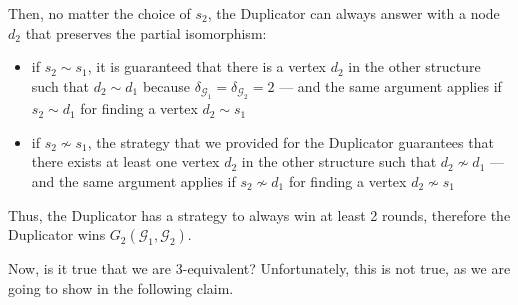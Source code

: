 \documentclass[a4paper, 12pt]{report}
\begin{document}
{{            Then, no matter the choice of $s_2$, the Duplicator can always answer with a node $d_2$ that preserves the partial isomorphism:

            \begin{itemize}
                \item if $s_2 \sim s_1$, it is guaranteed that there is a vertex $d_2$ in the other structure such that $d_2 \sim d_1$ because $\delta_{\mathcal G_1} = \delta_{\mathcal G_2} = 2$ --- and the same argument applies if $s_2 \sim d_1$ for finding a vertex $d_2 \sim s_1$
                \item if $s_2 \nsim s_1$, the strategy that we provided for the Duplicator guarantees that there exists at least one vertex $d_2$ in the other structure such that $d_2 \nsim d_1$ --- and the same argument applies if $s_2 \nsim d_1$ for finding a vertex $d_2 \nsim s_1$
            \end{itemize}

            Thus, the Duplicator has a strategy to always win at least 2 rounds, therefore the Duplicator wins $G_2(\mathcal G_1, \mathcal G_2)$.
        }

        Now, is it true that we are 3-equivalent? Unfortunately, this is not true, as we are going to show in the following claim.


}
\end{document}
